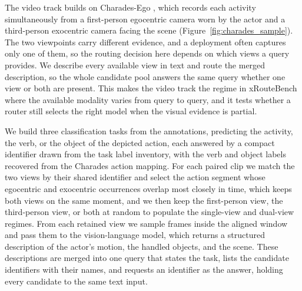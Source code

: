 The video track builds on Charades-Ego \citep{sigurdsson2018charades}, which records each activity simultaneously from a first-person egocentric camera worn by the actor and a third-person exocentric camera facing the scene (Figure~\ref{fig:charades_sample}). The two viewpoints carry different evidence, and a deployment often captures only one of them, so the routing decision here depends on which views a query provides. We describe every available view in text and route the merged description, so the whole candidate pool answers the same query whether one view or both are present. This makes the video track the regime in xRouteBench where the available modality varies from query to query, and it tests whether a router still selects the right model when the visual evidence is partial.

We build three classification tasks from the annotations, predicting the activity, the verb, or the object of the depicted action, each answered by a compact identifier drawn from the task label inventory, with the verb and object labels recovered from the Charades action mapping. For each paired clip we match the two views by their shared identifier and select the action segment whose egocentric and exocentric occurrences overlap most closely in time, which keeps both views on the same moment, and we then keep the first-person view, the third-person view, or both at random to populate the single-view and dual-view regimes. From each retained view we sample frames inside the aligned window and pass them to the vision-language model, which returns a structured description of the actor's motion, the handled objects, and the scene. These descriptions are merged into one query that states the task, lists the candidate identifiers with their names, and requests an identifier as the answer, holding every candidate to the same text input.

